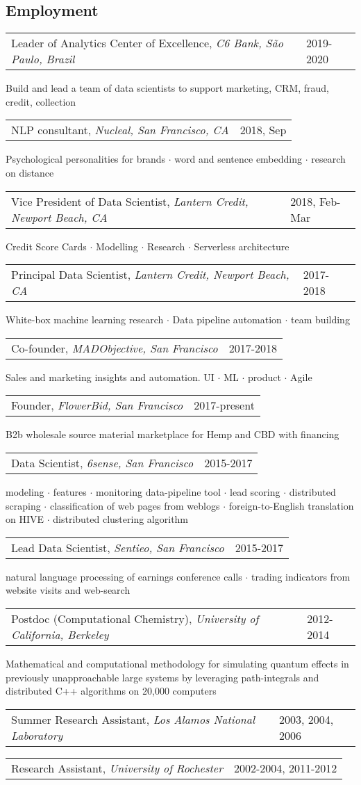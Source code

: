 \documentclass{res}
\makeatletter
\newcommand{\af}[3]{
\begin{tabular*}{\textwidth}[t]{@{}p{5.2in} l} 
    #1, \textit{#2} & #3\\
  \end{tabular*}
}
\newcommand{\aff}[4]{
\begin{tabular*}{\textwidth}[t]{@{}p{5.2in} l} 
    #1, \textit{#2} & #3\\
  \end{tabular*}
  {\color[RGB]{106,106,106} #4}\\
}
\makeatother
\begin{document}
 


\address{
  1632 Walnut St.\\
  Berkeley, CA 94709 \\
}
\address{
  (585) 313-6024\\
  kirill.igum@gmail.com\\
  \url{www.linkedin.com/in/kirilligum}
}

\begin{resume}

\section{Employment}
\aff{
Leader of Analytics Center of Excellence}{C6 Bank, S\~{a}o Paulo, Brazil}{2019-2020}{ 
	Build and lead a team of data scientists to support marketing, CRM, fraud, credit, collection
}
\aff{NLP consultant}{Nucleal, San Francisco, CA}{2018, Sep}{ 
	Psychological personalities for brands $\cdot$ word and sentence embedding $\cdot$ research on distance
}
\aff{Vice President of Data Scientist}{Lantern Credit, Newport Beach, CA}{2018, Feb-Mar}{ 
	Credit Score Cards $\cdot$ Modelling $\cdot$ Research $\cdot$ Serverless architecture
} 
\aff{Principal Data Scientist}{Lantern Credit, Newport Beach, CA}{2017-2018}{ 
	White-box machine learning research $\cdot$ Data pipeline automation $\cdot$ team building
} 
\aff{Co-founder}{MADObjective, San Francisco}{2017-2018}{ 
	Sales and marketing insights and automation. UI $\cdot$ ML $\cdot$ product $\cdot$ Agile
} 
\aff{Founder}{FlowerBid, San Francisco}{2017-present}{ 
	B2b wholesale source material marketplace for Hemp and CBD with financing 
} 
\aff{Data Scientist}{6sense, San Francisco}{2015-2017}{ 
	modeling $\cdot$ 
	features $\cdot$  
	monitoring data-pipeline tool $\cdot$ 
	lead scoring $\cdot$
	distributed scraping $\cdot$
	classification of web pages from weblogs $\cdot$
	foreign-to-English translation on HIVE $\cdot$
	distributed clustering algorithm
} 
\aff{Lead Data Scientist}{Sentieo, San Francisco}{2015-2017}{ 
	natural language processing of earnings conference calls $\cdot$ trading indicators from website visits and web-search
} 
\aff{Postdoc (Computational Chemistry)}{University of California, Berkeley}{2012-2014}{ 
  Mathematical and computational methodology for simulating quantum effects in previously unapproachable large systems by leveraging path-integrals and distributed C++ algorithms on 20,000 computers
} 
\af{Summer Research Assistant}{Los Alamos National Laboratory}{2003, 2004, 2006}
\af{Research Assistant}{University of Rochester}{2002-2004, 2011-2012}
 

\end{resume}
\end{document}
